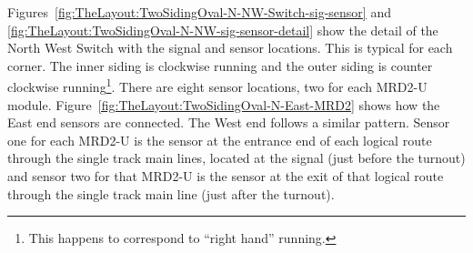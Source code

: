 Figures~\ref{fig:TheLayout:TwoSidingOval-N-NW-Switch-sig-sensor} and
\ref{fig:TheLayout:TwoSidingOval-N-NW-sig-sensor-detail} show the
detail of the North West Switch with the signal and sensor locations.
This is typical for each corner. The inner siding is clockwise running
and the outer siding is counter clockwise running\footnote{This happens
to correspond to ``right hand'' running.}.  There are eight sensor
locations, two for each MRD2-U module. 
Figure~\ref{fig:TheLayout:TwoSidingOval-N-East-MRD2} shows how the
East end sensors are connected.  The West end follows a similar
pattern. Sensor one for each MRD2-U is the sensor at the entrance end
of each logical route through the single track main lines, located at
the signal (just before the turnout) and sensor two for that MRD2-U is
the sensor at the exit of that logical route through the single track
main line (just after the turnout).

